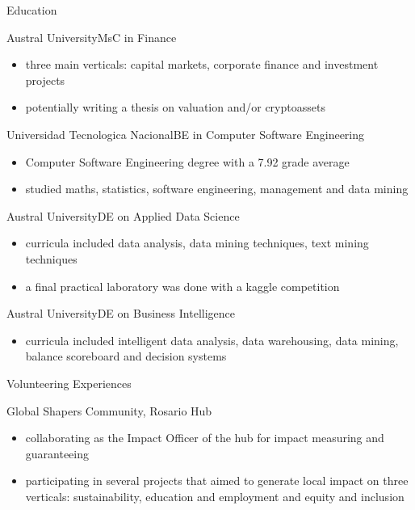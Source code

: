 \documentclass{article}
\newlength{\tabin}
\newlength{\secsep}
\newcommand{\lineunder}{\vspace*{-8pt} \\ \hspace*{-6pt} \hrulefill \\ \vspace*{-15pt}}
\newenvironment{tabbedsection}[1]{
  \begin{list}{}{
      \setlength{\itemsep}{0pt}
      \setlength{\labelsep}{0pt}
      \setlength{\labelwidth}{0pt}
      \setlength{\leftmargin}{\tabin}
      \setlength{\rightmargin}{\tabin}
      \setlength{\listparindent}{0pt}
      \setlength{\parsep}{0pt}
      \setlength{\parskip}{0pt}
      \setlength{\partopsep}{0pt}
      \setlength{\topsep}{#1}
    }
  \item[]
}{\end{list}}
\newenvironment{resume_section}[1]{
  \filbreak
  \vspace{1\secsep}
  \textsc{\large#1}
  \lineunder
  \begin{tabbedsection}{\secsep}
}{\end{tabbedsection}}
\newenvironment{resume_subsection}[2][]{
  \textbf{#2} \hfill {\footnotesize #1} \hspace{2em}
  \begin{tabbedsection}{0.25\secsep}
}{\end{tabbedsection}}
\newenvironment{subitems}{
  \renewcommand{\labelitemi}{-}
  \begin{itemize}
      \setlength{\labelsep}{1em}
}{\end{itemize}}
\begin{document}
\begin{resume_section}{Education}
  \begin{resume_subsection}{Austral University}{MsC in Finance}
    \begin{subitems}
      \item three main verticals: capital markets, corporate finance and investment projects
      \item potentially writing a thesis on valuation and/or cryptoassets
    \end{subitems}
    \end{resume_subsection}
  \begin{resume_subsection}{Universidad Tecnologica Nacional}{BE in Computer Software Engineering}
    \begin{subitems}
      \item Computer Software Engineering degree with a 7.92 grade average
      \item studied maths, statistics, software engineering, management and data mining
    \end{subitems}
    \end{resume_subsection}
  \begin{resume_subsection}{Austral University}{DE on Applied Data Science}
    \begin{subitems}
      \item curricula included data analysis, data mining techniques, text mining techniques
      \item a final practical laboratory was done with a kaggle competition
    \end{subitems}
    \end{resume_subsection}
  \begin{resume_subsection}{Austral University}{DE on Business Intelligence}
    \begin{subitems}
      \item curricula included intelligent data analysis, data warehousing, data mining, balance scoreboard and decision systems
    \end{subitems}
  \end{resume_subsection}
\end{resume_section}

\begin{resume_section}{Volunteering Experiences}
  \begin{resume_subsection}{Global Shapers Community, Rosario Hub}
    \begin{subitems}  
      \item collaborating as the Impact Officer of the hub for impact measuring and guaranteeing
      \item participating in several projects that aimed to generate local impact on three verticals: sustainability, education and employment and equity and inclusion
    \end{subitems}
  \end{resume_subsection}
\end{resume_section}
\end{document}
